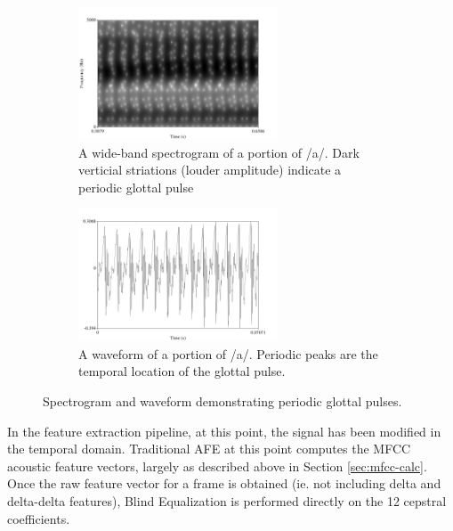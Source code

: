 \begin{figure}[H!]
\centering
\begin{subfigure}{0.75\textwidth}
\centering
\includegraphics[width=0.65\textwidth]{figure/glot-spect.png}
\caption{A wide-band spectrogram of a portion of /a/. Dark verticial striations (louder amplitude) indicate a periodic glottal pulse}\label{fig:glot-spect}
\end{subfigure}
\begin{subfigure}{0.75\textwidth}
\centering
\includegraphics[width=0.65\textwidth]{figure/glot-wav.png}
\caption{A waveform of a portion of /a/.  Periodic peaks are the temporal location of the glottal pulse.}\label{fig:glot-wav}
\end{subfigure}
\caption{Spectrogram and waveform demonstrating periodic glottal pulses.}\label{fig:glot-puls}
\end{figure}

In the feature extraction pipeline, at this point, the signal has been modified in the temporal domain.  Traditional AFE at this point computes the MFCC acoustic feature vectors, largely as described above in Section \ref{sec:mfcc-calc}.  Once the raw feature vector for a frame is obtained (ie. not including delta and delta-delta features), Blind Equalization is performed directly on the 12 cepstral coefficients.

